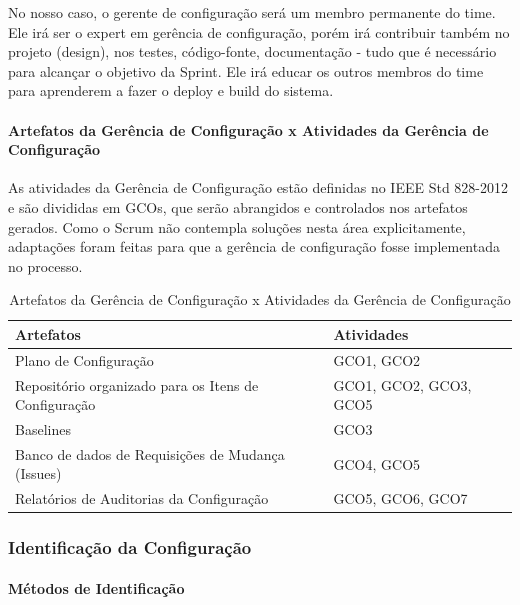 No nosso caso, o gerente de configuração será um membro permanente do time. Ele irá ser o expert em gerência de configuração, porém irá contribuir também no projeto (design), nos testes, código-fonte, documentação - tudo que é necessário para alcançar o objetivo da Sprint. Ele irá educar os outros membros do time para aprenderem a fazer o deploy e build do sistema.

\paragraph{Artefatos da Gerência de Configuração x Atividades da Gerência de Configuração} 

As atividades da Gerência de Configuração estão definidas no IEEE Std 828-2012 \cite{6170935} e são divididas em GCOs, que serão abrangidos e controlados nos artefatos gerados. Como o Scrum não contempla soluções nesta área explicitamente, adaptações foram feitas para que a gerência de configuração fosse implementada no processo.

\begin{table}[H]
      \begin{center}
        \begin{tabular}{| l | l |}
        \hline
        \textbf{Artefatos} & \textbf{Atividades} \\ \hline
        Plano de Configuração & GCO1, GCO2 \\ \hline
        Repositório organizado para os Itens de Configuração & GCO1, GCO2, GCO3, GCO5 \\ \hline
        Baselines & GCO3 \\ \hline
        Banco de dados de Requisições de Mudança (Issues) & GCO4, GCO5 \\ \hline
        Relatórios de Auditorias da Configuração & GCO5, GCO6, GCO7 \\ \hline
        \end{tabular}
      \end{center}
    \caption{Artefatos da Gerência de Configuração x Atividades da Gerência de Configuração}
    \end{table}
 
  

 \subsubsection{Identificação da Configuração}

 \paragraph{Métodos de Identificação}

